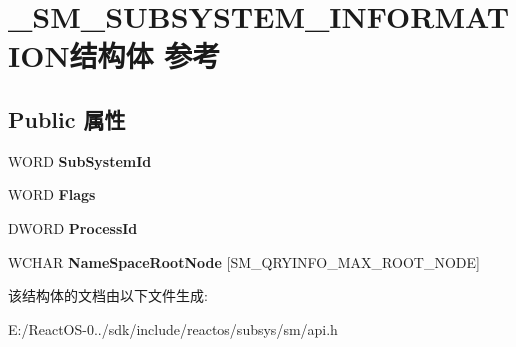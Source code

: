 \hypertarget{struct___s_m___s_u_b_s_y_s_t_e_m___i_n_f_o_r_m_a_t_i_o_n}{}\section{\+\_\+\+S\+M\+\_\+\+S\+U\+B\+S\+Y\+S\+T\+E\+M\+\_\+\+I\+N\+F\+O\+R\+M\+A\+T\+I\+O\+N结构体 参考}
\label{struct___s_m___s_u_b_s_y_s_t_e_m___i_n_f_o_r_m_a_t_i_o_n}
\subsection*{Public 属性}
\begin{DoxyCompactItemize}
\item 
\mbox{\label{struct___s_m___s_u_b_s_y_s_t_e_m___i_n_f_o_r_m_a_t_i_o_n_a7ed264d13eb3cb8be07f634541eecf68}} 
W\+O\+RD {\bfseries Sub\+System\+Id}
\item 
\mbox{\label{struct___s_m___s_u_b_s_y_s_t_e_m___i_n_f_o_r_m_a_t_i_o_n_ac54c3fc51d3282ba47cbe80f315bec1b}} 
W\+O\+RD {\bfseries Flags}
\item 
\mbox{\label{struct___s_m___s_u_b_s_y_s_t_e_m___i_n_f_o_r_m_a_t_i_o_n_aa5489bff0a331057e6f94ef4c97ff4a4}} 
D\+W\+O\+RD {\bfseries Process\+Id}
\item 
\mbox{\label{struct___s_m___s_u_b_s_y_s_t_e_m___i_n_f_o_r_m_a_t_i_o_n_a990fe7ae0f0984a69e7cfeab856620e8}} 
W\+C\+H\+AR {\bfseries Name\+Space\+Root\+Node} \mbox{[}S\+M\+\_\+\+Q\+R\+Y\+I\+N\+F\+O\+\_\+\+M\+A\+X\+\_\+\+R\+O\+O\+T\+\_\+\+N\+O\+DE\mbox{]}
\end{DoxyCompactItemize}


该结构体的文档由以下文件生成\+:\begin{DoxyCompactItemize}
\item 
E\+:/\+React\+O\+S-\/0../sdk/include/reactos/subsys/sm/api.\+h\end{DoxyCompactItemize}
